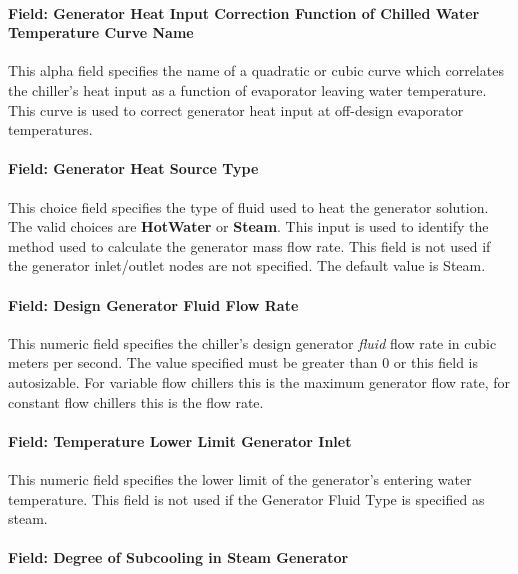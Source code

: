 \paragraph{Field: Generator Heat Input Correction Function of Chilled Water Temperature Curve Name}\label{field-generator-heat-input-correction-function-of-chilled-water-temperature-curve-name}

This alpha field specifies the name of a quadratic or cubic curve which correlates the chiller's heat input as a function of evaporator leaving water temperature. This curve is used to correct generator heat input at off-design evaporator temperatures.

\paragraph{Field: Generator Heat Source Type}\label{field-generator-heat-source-type}

This choice field specifies the type of fluid used to heat the generator solution. The valid choices are \textbf{HotWater} or \textbf{Steam}. This input is used to identify the method used to calculate the generator mass flow rate. This field is not used if the generator inlet/outlet nodes are not specified. The default value is Steam.

\paragraph{Field: Design Generator Fluid Flow Rate}\label{field-design-generator-fluid-flow-rate-1}

This numeric field specifies the chiller's design generator \emph{fluid} flow rate in cubic meters per second. The value specified must be greater than 0 or this field is autosizable. For variable flow chillers this is the maximum generator flow rate, for constant flow chillers this is the flow rate.

\paragraph{Field: Temperature Lower Limit Generator Inlet}\label{field-temperature-lower-limit-generator-inlet}

This numeric field specifies the lower limit of the generator's entering water temperature. This field is not used if the Generator Fluid Type is specified as steam.

\paragraph{Field: Degree of Subcooling in Steam Generator}\label{field-degree-of-subcooling-in-steam-generator-1}

